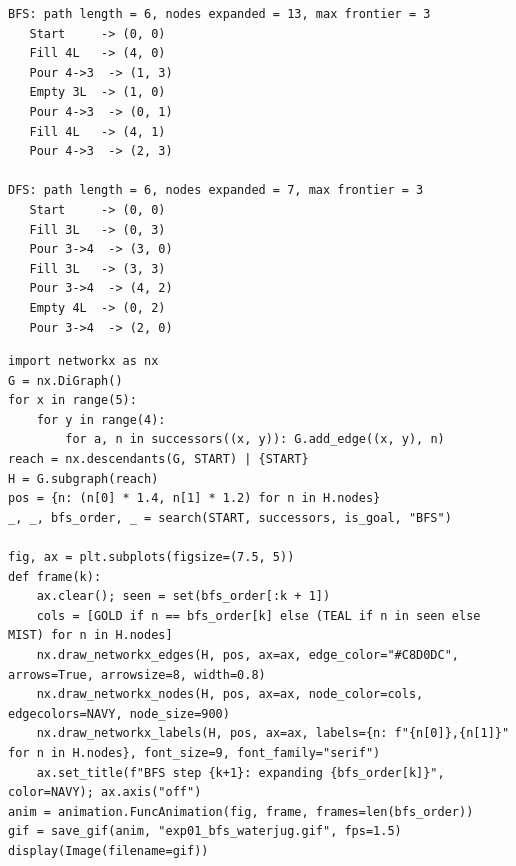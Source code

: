 \documentclass[11pt]{article}
\begin{document}
\begin{lstlisting}[style=out]
BFS: path length = 6, nodes expanded = 13, max frontier = 3
   Start     -> (0, 0)
   Fill 4L   -> (4, 0)
   Pour 4->3  -> (1, 3)
   Empty 3L  -> (1, 0)
   Pour 4->3  -> (0, 1)
   Fill 4L   -> (4, 1)
   Pour 4->3  -> (2, 3)

DFS: path length = 6, nodes expanded = 7, max frontier = 3
   Start     -> (0, 0)
   Fill 3L   -> (0, 3)
   Pour 3->4  -> (3, 0)
   Fill 3L   -> (3, 3)
   Pour 3->4  -> (4, 2)
   Empty 4L  -> (0, 2)
   Pour 3->4  -> (2, 0)
\end{lstlisting}
\begin{lstlisting}[style=py]
import networkx as nx
G = nx.DiGraph()
for x in range(5):
    for y in range(4):
        for a, n in successors((x, y)): G.add_edge((x, y), n)
reach = nx.descendants(G, START) | {START}
H = G.subgraph(reach)
pos = {n: (n[0] * 1.4, n[1] * 1.2) for n in H.nodes}
_, _, bfs_order, _ = search(START, successors, is_goal, "BFS")

fig, ax = plt.subplots(figsize=(7.5, 5))
def frame(k):
    ax.clear(); seen = set(bfs_order[:k + 1])
    cols = [GOLD if n == bfs_order[k] else (TEAL if n in seen else MIST) for n in H.nodes]
    nx.draw_networkx_edges(H, pos, ax=ax, edge_color="#C8D0DC", arrows=True, arrowsize=8, width=0.8)
    nx.draw_networkx_nodes(H, pos, ax=ax, node_color=cols, edgecolors=NAVY, node_size=900)
    nx.draw_networkx_labels(H, pos, ax=ax, labels={n: f"{n[0]},{n[1]}" for n in H.nodes}, font_size=9, font_family="serif")
    ax.set_title(f"BFS step {k+1}: expanding {bfs_order[k]}", color=NAVY); ax.axis("off")
anim = animation.FuncAnimation(fig, frame, frames=len(bfs_order))
gif = save_gif(anim, "exp01_bfs_waterjug.gif", fps=1.5)
display(Image(filename=gif))
\end{lstlisting}
\end{document}
